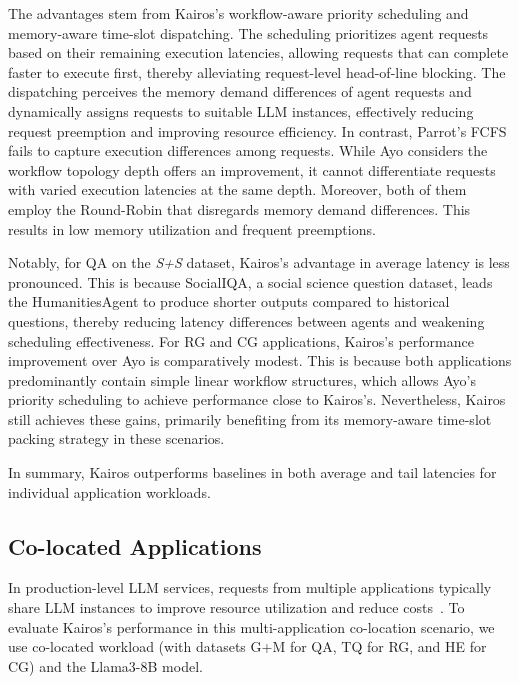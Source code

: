 \documentclass[sigplan,nonacm]{acmart}
\newcommand{\system}{Kairos}
\begin{document}
The advantages stem from \system{}'s workflow-aware priority scheduling and memory-aware time-slot dispatching. 
The scheduling prioritizes agent requests based on their remaining execution latencies, allowing requests that can complete faster to execute first, thereby alleviating request-level head-of-line blocking. 
The dispatching perceives the memory demand differences of agent requests and dynamically assigns requests to suitable LLM instances, effectively reducing request preemption and improving resource efficiency.
In contrast, Parrot's FCFS fails to capture execution differences among requests.
While Ayo considers the workflow topology depth offers an improvement, it cannot differentiate requests with varied execution latencies at the same depth. 
Moreover, both of them employ the Round-Robin that disregards memory demand differences. This results in low memory utilization and frequent preemptions.


Notably, for QA on the \textit{S+S} dataset, \system{}'s advantage in average latency is less pronounced. This is because SocialIQA, a social science question dataset, leads the HumanitiesAgent to produce shorter outputs compared to historical questions, thereby reducing latency differences between agents and weakening scheduling effectiveness. For RG and CG applications, \system{}'s performance improvement over Ayo is comparatively modest. This is because both applications predominantly contain simple linear workflow structures, which allows Ayo’s priority scheduling to achieve performance close to \system{}’s. Nevertheless, \system{} still achieves these gains, primarily benefiting from its memory-aware time-slot packing strategy in these scenarios.

In summary, \system{} outperforms baselines in both average and tail latencies for individual application workloads.




\subsection{Co-located Applications}
\label{sec:co-location}


In production-level LLM services, requests from multiple applications typically share LLM instances to improve resource utilization and reduce costs~\cite{10.5555/3691938.3691988,298685}.  
To evaluate \system{}'s performance in this multi-application co-location scenario, we use co-located workload (with datasets G+M for QA, TQ for RG, and HE for CG) and the Llama3-8B model.
\end{document}

